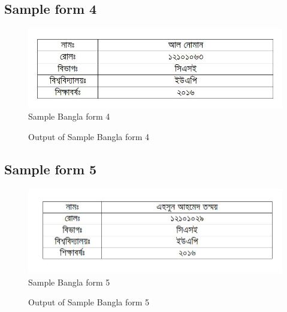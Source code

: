\subsection{Sample form 4}
\begin{figure}[H]
\centering
\includegraphics[width=1\textwidth]{formBen04}
\caption {Sample Bangla form 4}
\label {fig:FormBan4}
\end{figure}
\begin{figure}[H]
\centering
{}
\caption {Output of Sample Bangla form 4}
\label {fig:FormBanOut4}
\end{figure}
\subsection{Sample form 5}
\begin{figure}[H]
\centering
\includegraphics[width=1\textwidth]{formBen05}
\caption {Sample Bangla form 5}
\label {fig:FormBan5}
\end{figure}
\begin{figure}[H]
\centering
{}
\caption {Output of Sample Bangla form 5}
\label {fig:FormBanOut5}
\end{figure}
